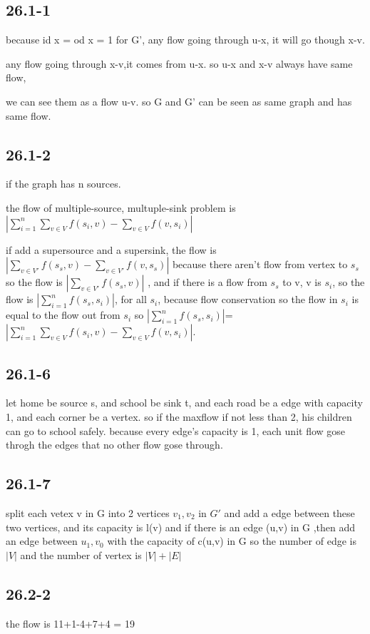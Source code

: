 \documentclass[a4paper,UTF8]{article}
\theoremstyle{definition}
\begin{document}
\subsection*{26.1-1}
because id x = od x = 1  for G', any flow  going through  u-x, it will go though x-v.

any flow going through x-v,it comes from u-x. so u-x and x-v always have same flow,

we can see them as a flow u-v. so G and G' can be seen as  same graph and has same flow.

\subsection*{26.1-2}
if the graph has n sources.

the flow of multiple-source, multuple-sink problem is $|\sum_{i=1}^{n} \sum_{v \in V}f(s_i,v)-\sum_{v \in V}f(v,s_i)|$

if add a supersource and a supersink, the flow is $| \sum_{v \in V'}f(s_s,v)- \sum_{v \in V'}f(v,s_s)|$ because there aren't flow from vertex to $s_s$
so the flow is $| \sum_{v \in V'}f(s_s,v)|$ , and if there is a flow from $s_s$ to v, v is $s_i$,
so the flow is $| \sum_{i=1}^{n}f(s_s,s_i)|$, for all $s_i$, because flow conservation so the flow in $s_i$ is equal to the flow out from $s_i$
so $| \sum_{i=1}^{n}f(s_s,s_i)|$=$|\sum_{i=1}^{n} \sum_{v \in V}f(s_i,v)-\sum_{v \in V}f(v,s_i)|$.
\subsection*{26.1-6}
let home be source s, and school be sink t, and each road be a edge with capacity 1, and each corner be a vertex.
so if the maxflow if not less than 2, his children can go to school safely. because every edge's capacity is 1, each unit flow gose throgh the edges that no other
flow gose through.
\subsection*{26.1-7}
split each vetex v in G into 2 vertices $v_1,v_2$ in $G'$ and add a edge between these two vertices, and its capacity is l(v)
and if there is an edge (u,v) in G ,then add an edge between $u_1,v_0$ with the capacity of c(u,v) in G
so the number of edge is $|V|$ and the number of vertex is $|V|+|E|$

\subsection*{26.2-2}
the flow is 11+1-4+7+4 = 19
\end{document}
